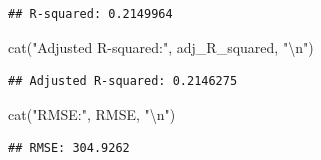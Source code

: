 \documentclass[
]{article}
\newenvironment{Shaded}{\begin{snugshade}}{\end{snugshade}}
\newcommand{\FunctionTok}[1]{\textcolor[rgb]{0.00,0.00,0.00}{#1}}
\newcommand{\NormalTok}[1]{#1}
\newcommand{\SpecialCharTok}[1]{\textcolor[rgb]{0.00,0.00,0.00}{#1}}
\newcommand{\StringTok}[1]{\textcolor[rgb]{0.31,0.60,0.02}{#1}}
\begin{document}
\begin{verbatim}
## R-squared: 0.2149964
\end{verbatim}

\begin{Shaded}
\begin{Highlighting}[]
\FunctionTok{cat}\NormalTok{(}\StringTok{"Adjusted R{-}squared:"}\NormalTok{, adj\_R\_squared, }\StringTok{"}\SpecialCharTok{\textbackslash{}n}\StringTok{"}\NormalTok{)}
\end{Highlighting}
\end{Shaded}

\begin{verbatim}
## Adjusted R-squared: 0.2146275
\end{verbatim}

\begin{Shaded}
\begin{Highlighting}[]
\FunctionTok{cat}\NormalTok{(}\StringTok{"RMSE:"}\NormalTok{, RMSE, }\StringTok{"}\SpecialCharTok{\textbackslash{}n}\StringTok{"}\NormalTok{)}
\end{Highlighting}
\end{Shaded}

\begin{verbatim}
## RMSE: 304.9262
\end{verbatim}
\end{document}

